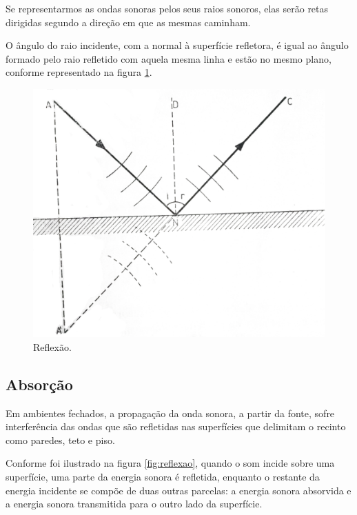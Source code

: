 Se representarmos as ondas sonoras pelos seus raios sonoros, elas serão retas dirigidas segundo a direção em que as mesmas caminham. \cite[pág.~84]{silva}

O ângulo do raio incidente, com a normal à superfície refletora, é igual ao ângulo formado pelo raio refletido com aquela mesma linha e estão no mesmo plano, conforme representado na figura \ref{fig:reflexao2}.

\begin{figure}[!htb]
\centering
\includegraphics[scale=0.15]{figuras/Reflexao2}
\caption{Reflexão. \cite{silva}}
\label{fig:reflexao2}
\end{figure}


\subsection{Absorção}

Em ambientes fechados, a propagação da onda sonora, a partir da fonte, sofre interferência das ondas que são refletidas nas superfícies que delimitam o recinto como paredes, teto e piso. \cite[pág~231]{bistafa}

Conforme foi ilustrado na figura \ref{fig:reflexao}, quando o som incide sobre uma superfície, uma parte da energia sonora é refletida, enquanto o restante da energia incidente se compõe de duas outras parcelas: a energia sonora absorvida e a energia sonora transmitida para o outro lado da superfície. \cite[pág.~231]{bistafa}


